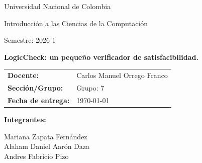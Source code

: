 \documentclass[12pt,a4paper]{article}
\newcommand{\Institucion}{Universidad Nacional de Colombia}
\newcommand{\Asignatura}{Introducción a las Ciencias de la Computación}
\newcommand{\NombrePractica}{LogicCheck: un pequeño verificador de
satisfacibilidad.}
\newcommand{\TituloInforme}{ \NombrePractica}
\newcommand{\Docente}{Carlos Manuel Orrego Franco}
\newcommand{\Seccion}{Grupo: 7}
\newcommand{\FechaEntrega}{\today}
\newcommand{\Integrantes}{%
Mariana Zapata
Fernández  \\
Alaham Daniel Aarón Daza\\
Andres Fabricio Pizo 
}
\newcommand{\Curso}{ Semestre: 2026-1}
\begin{document}
\begin{titlepage}
  \centering

  {\Large \Institucion \par}
  \vspace{0.4cm}
  {\large \Asignatura \par}
  \vspace{0.2cm}
  {\large \Curso \par}

  \vspace{1.4cm}
  {\LARGE \bfseries \TituloInforme \par}
  \vspace{0.3cm}


  \vspace{1.2cm}

  \begin{minipage}{0.9\textwidth}
  \setlength{\tabcolsep}{10pt}
  \renewcommand{\arraystretch}{1.3}
  \begin{tabular}{@{}ll@{}}
    \textbf{Docente:} & \Docente \\
    \textbf{Sección/Grupo:} & \Seccion \\
    \textbf{Fecha de entrega:} & \FechaEntrega \\
  \end{tabular}
  \end{minipage}

  \vspace{1.0cm}

  \begin{minipage}{0.9\textwidth}
    \textbf{Integrantes:}\par
    \vspace{0.3cm}
    \Integrantes
  \end{minipage}

  \vfill
  
\end{titlepage}

\begin{abstract}
\noindent
Este informe desarrolla la evaluación de logickcheck Lab, una herramienta educativa para mostrar cómo una computadora puede razonar sobre fórmulas proposicionales pequeñas.Donde se busca construir un verificador de satisfacibilidad proposicional (SAT) que determine si una fórmula lógica dada es satisfacible o no. Para esto se implementa un algoritmo de backtracking que explora el espacio de asignaciones posibles para las variables de la fórmula, aplicando técnicas de poda para descartar ramas del árbol de búsqueda que no pueden conducir a una solución satisfacible. El informe incluye una descripción detallada del procedimiento seguido, un modelamiento manual de un caso pequeño para ilustrar el funcionamiento del algoritmo, y una implementación en Python. Además, se discuten las decisiones tomadas durante el desarrollo, los resultados obtenidos y las conclusiones finales sobre la efectividad del enfoque utilizado.
\medskip
\noindent
\end{abstract}
\end{document}
